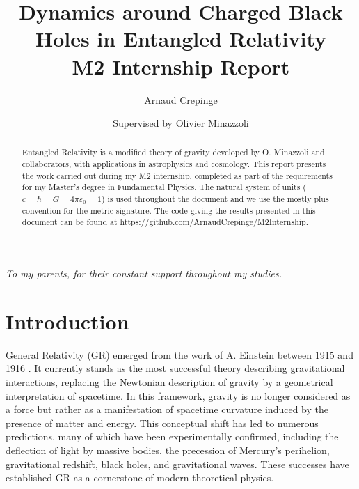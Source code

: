 \documentclass[floats,floatfix,aps, preprintnumbers,nofootinbib]{revtex4-2}
\begin{document}
\title{Dynamics around Charged Black Holes in Entangled Relativity\\
M2 Internship Report}

\author{Arnaud Crepinge}

\author{Supervised by Olivier Minazzoli}


\begin{abstract}  

Entangled Relativity is a modified theory of gravity developed by O. Minazzoli and collaborators, with applications in astrophysics and cosmology. This report presents the work carried out during my M2 internship, completed as part of the requirements for my Master’s degree in Fundamental Physics. The natural system of units ($c = \hbar = G = 4\pi\varepsilon_0 = 1$) is used throughout the document and we use the mostly plus convention for the metric signature. The code giving the results presented in this document can be found at \href{https://github.com/ArnaudCrepinge/M2Internship}{https://github.com/ArnaudCrepinge/M2Internship}.

\end{abstract}


\maketitle 

\begin{flushright}
    \textit{To my parents, for their constant support throughout my studies.}
\end{flushright}

\section{Introduction}

General Relativity (GR) emerged from the work of A. Einstein between 1915 and 1916 \cite{Einstein1916GR}. It currently stands as the most successful theory describing gravitational interactions, replacing the Newtonian description of gravity by a geometrical interpretation of spacetime. In this framework, gravity is no longer considered as a force but rather as a manifestation of spacetime curvature induced by the presence of matter and energy. This conceptual shift has led to numerous predictions, many of which have been experimentally confirmed, including the deflection of light by massive bodies, the precession of Mercury's perihelion, gravitational redshift, black holes, and gravitational waves. These successes have established GR as a cornerstone of modern theoretical physics.
\end{document}
